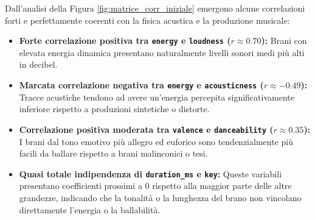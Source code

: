 Dall'analisi della Figura \ref{fig:matrice_corr_iniziale} emergono alcune correlazioni forti e perfettamente coerenti con la fisica acustica e la produzione musicale:
\begin{itemize}
    \item \textbf{Forte correlazione positiva tra \texttt{energy} e \texttt{loudness} ($r \approx 0.70$):} Brani con elevata energia dinamica presentano naturalmente livelli sonori medi più alti in decibel.
    \item \textbf{Marcata correlazione negativa tra \texttt{energy} e \texttt{acousticness} ($r \approx -0.49$):} Tracce acustiche tendono ad avere un'energia percepita significativamente inferiore rispetto a produzioni sintetiche o distorte.
    \item \textbf{Correlazione positiva moderata tra \texttt{valence} e \texttt{danceability} ($r \approx 0.35$):} I brani dal tono emotivo più allegro ed euforico sono tendenzialmente più facili da ballare rispetto a brani malinconici o tesi.
    \item \textbf{Quasi totale indipendenza di \texttt{duration\_ms} e \texttt{key}:} Queste variabili presentano coefficienti prossimi a 0 rispetto alla maggior parte delle altre grandezze, indicando che la tonalità o la lunghezza del brano non vincolano direttamente l'energia o la ballabilità.
\end{itemize}


